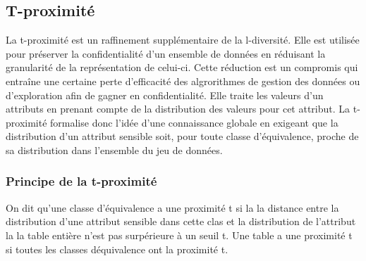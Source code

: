 \subsection{T-proximité}
La t-proximité est un raffinement supplémentaire de la l-diversité. Elle est utilisée pour préserver la confidentialité d'un ensemble de données en réduisant la granularité de la représentation de celui-ci. Cette réduction est un compromis qui entraîne une certaine perte d'efficacité des algrorithmes de gestion des données ou d'exploration afin de gagner en confidentialité. Elle traite les valeurs d'un attributs en prenant compte de la distribution des valeurs pour cet attribut.
La t-proximité formalise donc l’idée d'une connaissance globale en exigeant que la distribution d’un attribut sensible soit, pour toute classe d'équivalence, proche de sa distribution dans l’ensemble du jeu de données. 
\subsubsection{Principe de la t-proximité}
On dit qu'une classe d'équivalence a une proximité t si la la distance entre la distribution d'une attribut sensible dans cette clas et la distribution de l'attribut la la table entière n'est pas surpérieure à un seuil t. Une table a une proximité t si toutes les classes déquivalence ont la proximité t.